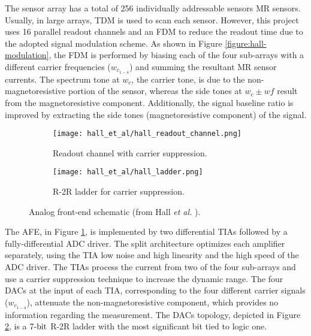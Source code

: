 The sensor array has a total of 256 individually addressable sensors \ac{MR} sensors. Usually, in large arrays, \ac{TDM} is used to scan each sensor. However, this project uses 16 parallel readout channels and an \ac{FDM} to reduce the readout time due to the adopted signal modulation scheme. As shown in Figure \ref{figure:hall-modulation}, the \ac{FDM} is performed by biasing each of the four sub-arrays with a different carrier frequencies ($w_{c_{1-4}}$) and summing the resultant \ac{MR} sensor currents. The spectrum tone at $w_c$, the carrier tone, is due to the non-magnetoresistive portion of the sensor, whereas the side tones at $w_c \pm wf$ result from the magnetoresistive component. Additionally, the signal baseline ratio is improved by extracting the side tones (magnetoresistive component) of the signal.

\begin{figure}[!ht]
    \centering
    \begin{subfigure}[b]{.49\textwidth}
        \centering
        \texttt{[image: hall\_et\_al/hall\_readout\_channel.png]}
        \caption{Readout channel with carrier suppression.}
        \label{figure:hall-readout-channel}
    \end{subfigure}
    \hfill
    \centering
    \begin{subfigure}[b]{.49\textwidth}
        \centering
        \texttt{[image: hall\_et\_al/hall\_ladder.png]}
        \caption{R-2R ladder for carrier suppression.}
        \label{figure:hall-ladder}
    \end{subfigure}
    \caption{Analog front-end schematic (from Hall \textit{et al.} \cite{PMID24761029}).}
    \label{figure:hall-afe}
\end{figure}

The \ac{AFE}, in Figure \ref{figure:hall-readout-channel}, is implemented by two differential \ac{TIA}s followed by a fully-differential \ac{ADC} driver. The split architecture optimizes each amplifier separately, using the \ac{TIA} low noise and high linearity and the high speed of the \ac{ADC} driver. The \ac{TIA}s process the current from two of the four sub-arrays and use a carrier suppression technique to increase the dynamic range. The four \ac{DAC}s at the input of each \ac{TIA}, corresponding to the four different carrier signals ($w_{c_{1-4}}$), attenuate the non-magnetoresistive component, which provides no information regarding the measurement. The \ac{DAC}s topology, depicted in Figure \ref{figure:hall-ladder}, is a $\mathrm{7\textnormal{-}bit}$ R-2R ladder with the most significant bit tied to logic one.

